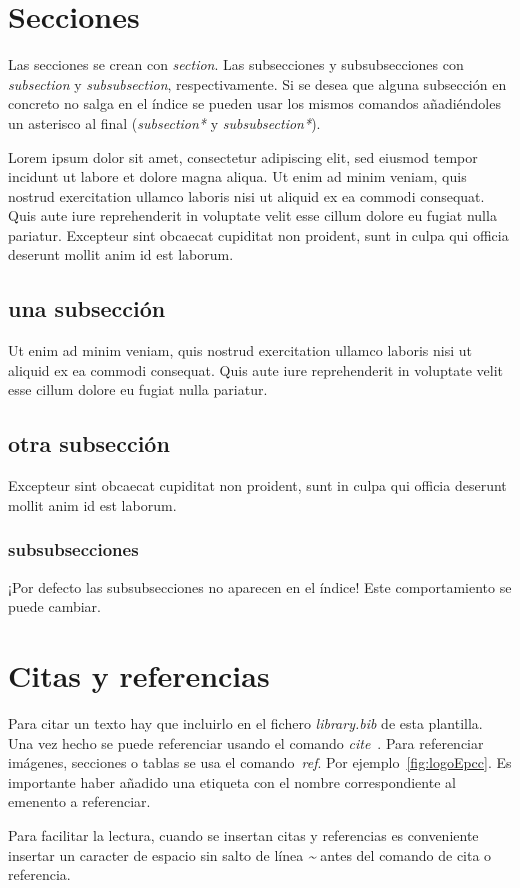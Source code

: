\documentclass[12pt,a4paper,twoside]{book}
\begin{document}
\section{Secciones}
Las secciones se crean con \textit{section}. Las subsecciones y subsubsecciones con \textit{subsection} y \textit{subsubsection}, respectivamente. Si se desea que alguna subsección en concreto no salga en el índice se pueden usar los mismos comandos añadiéndoles un asterisco al final (\textit{subsection*} y \textit{subsubsection*}).
\par
Lorem ipsum dolor sit amet, consectetur adipiscing elit, sed eiusmod tempor incidunt ut labore et dolore magna aliqua. Ut enim ad minim veniam, quis nostrud exercitation ullamco laboris nisi ut aliquid ex ea commodi consequat. Quis aute iure reprehenderit in voluptate velit esse cillum dolore eu fugiat nulla pariatur. Excepteur sint obcaecat cupiditat non proident, sunt in culpa qui officia deserunt mollit anim id est laborum.
\subsection{una subsección}
Ut enim ad minim veniam, quis nostrud exercitation ullamco laboris nisi ut aliquid ex ea commodi consequat. Quis aute iure reprehenderit in voluptate velit esse cillum dolore eu fugiat nulla pariatur.
\subsection{otra subsección}
Excepteur sint obcaecat cupiditat non proident, sunt in culpa qui officia deserunt mollit anim id est laborum.
\subsubsection{subsubsecciones}
¡Por defecto las subsubsecciones no aparecen en el índice! Este comportamiento se puede cambiar.

\section{Citas y referencias}
Para citar un texto hay que incluirlo en el fichero \textit{library.bib} de esta plantilla. Una vez hecho se puede\cite{Sanfeliu} referenciar usando el comando \textit{cite}~\cite{LaTeX_tutorials}.
Para referenciar imágenes, secciones o tablas se usa el comando~\textit{ref}. Por ejemplo~\ref{fig:logoEpcc}. Es importante haber añadido una etiqueta con el nombre correspondiente al emenento a referenciar.
\par
Para facilitar la lectura, cuando se insertan citas y referencias es conveniente insertar un caracter de espacio sin salto de línea \textit{\~} antes del comando de cita o referencia.
\end{document}
